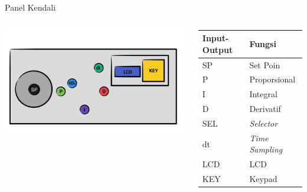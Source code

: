 \documentclass[10pt,xcolor={dvipsnames}]{beamer}
\begin{document}
\begin{frame}{Panel Kendali}
	\begin{columns}[T]
		\begin{column}{0.6\textwidth}
			\centering
			\includegraphics[width=10cm]{Gambar Lain/KONTORU.jpg}
		\end{column}
		\begin{column}{0.3\textwidth}
			\centering
			\begin{tabular}{ | m{1cm} | m{2cm}|} 
				\hline
				\textbf{Input-Output} & \textbf{Fungsi}\\
				\hline
				SP & Set Poin\\ 
				\hline
				P & Proporsional\\
				\hline
				I & Integral\\
				\hline
				D & Derivatif\\
				\hline
				SEL & \textit{Selector}\\
				\hline
				dt & \textit{Time Sampling}\\
				\hline
				LCD & LCD\\
				\hline
				KEY & Keypad \\
				\hline
			\end{tabular}
		\end{column}
	\end{columns}
\end{frame}
\end{document}
